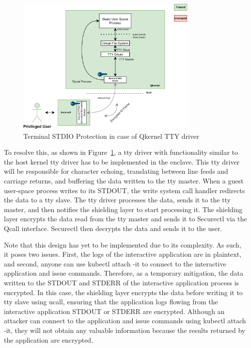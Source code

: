 \begin{figure}[H]
    \centering
    \includegraphics[width=0.8\textwidth]{images/terminal_shiled3.png}
    \caption[Terminal STDIO Protection in case of using Qkernel TTY driver]{Terminal STDIO Protection in case of Qkernel TTY driver}
    \label{fig:terminal_shiled3}
\end{figure}

To resolve this, as shown in Figure~\ref{fig:terminal_shiled3}, a tty driver with functionality similar to the host kernel tty driver has to be implemented in the enclave. This tty driver will be responsible for character echoing, translating between line feeds and carriage returns, and buffering 
the data written to the tty master. When a guest user-space process writes to its STDOUT, the write system call handler redirects the data to a tty slave. The tty driver processes the data, sends it to the tty master, and then notifies the shielding 
layer to start processing it. The shielding layer encrypts the data read from the tty master and sends it to Securectl via the Qcall interface. Securectl then decrypts the data and sends it to the user.

Note that this design has yet to be implemented due to its complexity. As such, it poses two issues. First, the logs of the interactive application are in plaintext, and second, anyone can use kubectl attach -it to connect to the interactive 
application and issue commands. Therefore, as a temporary mitigation, the data written to the STDOUT and STDERR of the interactive application process is encrypted. In this case, the shielding layer encrypts the data before writing it to tty slave 
using ucall, ensuring that the application logs flowing from the interactive application STDOUT or STDERR are encrypted. Although an attacker can connect to the application and issue commands using kubectl attach -it, they will not obtain any 
valuable information because the results returned by the application are encrypted.


